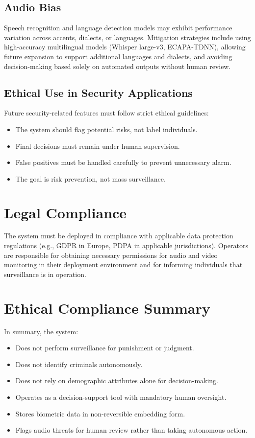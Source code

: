\documentclass[12pt]{report}
\begin{document}
\subsection{Audio Bias}
Speech recognition and language detection models may exhibit performance variation across accents, dialects, or languages. Mitigation strategies include using high-accuracy multilingual models (Whisper large-v3, ECAPA-TDNN), allowing future expansion to support additional languages and dialects, and avoiding decision-making based solely on automated outputs without human review.

\subsection{Ethical Use in Security Applications}
Future security-related features must follow strict ethical guidelines:
\begin{itemize}
    \item The system should flag potential risks, not label individuals.
    \item Final decisions must remain under human supervision.
    \item False positives must be handled carefully to prevent unnecessary alarm.
    \item The goal is risk prevention, not mass surveillance.
\end{itemize}

\section{Legal Compliance}
The system must be deployed in compliance with applicable data protection regulations (e.g., GDPR in Europe, PDPA in applicable jurisdictions). Operators are responsible for obtaining necessary permissions for audio and video monitoring in their deployment environment and for informing individuals that surveillance is in operation.

\section{Ethical Compliance Summary}
In summary, the system:
\begin{itemize}
    \item Does not perform surveillance for punishment or judgment.
    \item Does not identify criminals autonomously.
    \item Does not rely on demographic attributes alone for decision-making.
    \item Operates as a decision-support tool with mandatory human oversight.
    \item Stores biometric data in non-reversible embedding form.
    \item Flags audio threats for human review rather than taking autonomous action.
\end{itemize}
\end{document}
